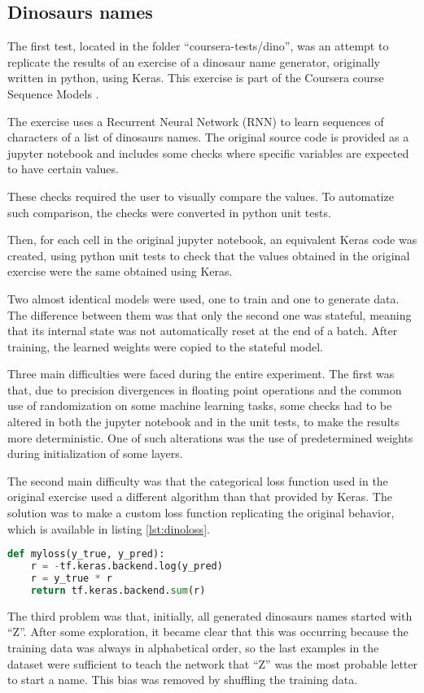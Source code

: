 \subsection{Dinosaurs names}
The first test, located in the folder ``coursera-tests/dino'', was an attempt to replicate the results of an exercise of a dinosaur name generator, originally written in python, using Keras. This exercise is part of the Coursera course Sequence Models .

The exercise uses a Recurrent Neural Network (RNN) to learn sequences of characters of a list of dinosaurs names. The original source code is provided as a jupyter notebook  and includes some checks where specific variables are expected to have certain values.

These checks required the user to visually compare the values. To automatize such comparison, the checks were converted in python unit tests.

Then, for each cell in the original jupyter notebook, an equivalent Keras code was created, using python unit tests to check that the values obtained in the original exercise were the same obtained using Keras.

Two almost identical models were used, one to train and one to generate data. The difference between them was that only the second one was stateful, meaning that its internal state was not automatically reset at the end of a batch. After training, the learned weights were copied to the stateful model.

Three main difficulties were faced during the entire experiment. The first was that, due to precision divergences in floating point operations and the common use of randomization on some machine learning tasks, some checks had to be altered in both the jupyter notebook and in the unit tests, to make the results more deterministic. One of such alterations was the use of predetermined weights during initialization of some layers.

The second main difficulty was that the categorical loss function used in the original exercise used a different algorithm than that provided by Keras. The solution was to make a custom loss function replicating the original behavior, which is available in listing \ref{lst:dinoloss}.

\noindent
\begin{minipage}{\linewidth}
\begin{lstlisting}[language=Python, frame=single, caption={Rnn loss}, label={lst:dinoloss}]
def myloss(y_true, y_pred):
    r = -tf.keras.backend.log(y_pred)
    r = y_true * r
    return tf.keras.backend.sum(r)
\end{lstlisting}
\end{minipage}

The third problem was that, initially, all generated dinosaurs names started with ``Z''. After some exploration, it became clear that this was occurring because the training data was always in alphabetical order, so the last examples in the dataset were sufficient to teach the network that ``Z'' was the most probable letter to start a name. This bias was removed by shuffling the training data.

